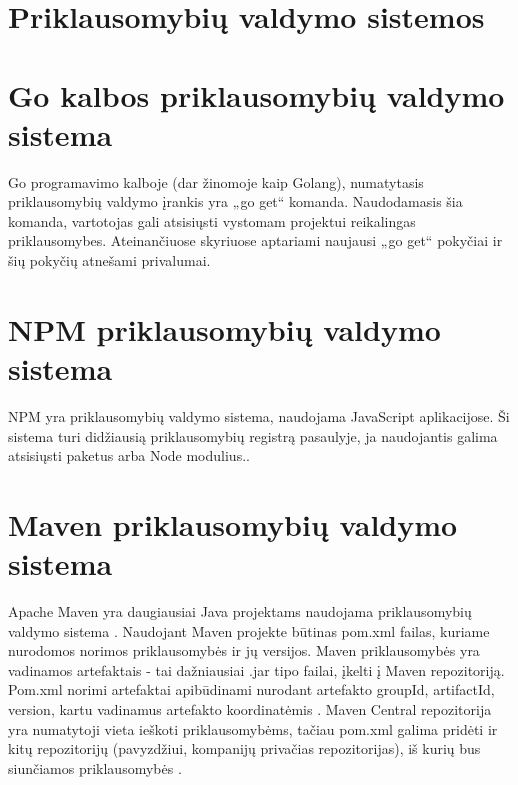 \section{Priklausomybių valdymo sistemos}



%



\section{Go kalbos priklausomybių valdymo sistema}

Go programavimo kalboje (dar žinomoje kaip Golang), numatytasis priklausomybių valdymo įrankis yra „go get“
komanda. Naudodamasis šia komanda, vartotojas gali atsisiųsti vystomam projektui reikalingas priklausomybes.
Ateinančiuose skyriuose aptariami naujausi „go get“ pokyčiai ir šių pokyčių atnešami privalumai.







\section{NPM priklausomybių valdymo sistema}

NPM yra priklausomybių valdymo sistema, naudojama JavaScript aplikacijose.
Ši sistema turi didžiausią priklausomybių registrą pasaulyje, ja naudojantis galima atsisiųsti paketus arba Node modulius.\cite{NPMa}.





\section{Maven priklausomybių valdymo sistema}

Apache Maven yra daugiausiai Java projektams naudojama priklausomybių valdymo sistema \cite{MAVENa}.
Naudojant Maven projekte būtinas pom.xml failas, kuriame nurodomos norimos priklausomybės ir jų versijos.
Maven priklausomybės yra vadinamos artefaktais - tai dažniausiai .jar tipo failai, įkelti į Maven repozitoriją.
Pom.xml norimi artefaktai apibūdinami nurodant artefakto groupId, artifactId, version, kartu vadinamus artefakto
koordinatėmis \cite{MAVENb}. Maven Central repozitorija yra numatytoji vieta ieškoti
priklausomybėms, tačiau pom.xml galima pridėti ir kitų repozitorijų (pavyzdžiui,
kompanijų privačias repozitorijas), iš kurių bus siunčiamos priklausomybės \cite{MAVENc}.

